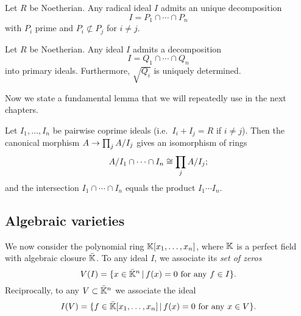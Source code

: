 \begin{proposition}
  Let $R$ be Noetherian. Any radical ideal $I$ admits an unique
  decomposition
  \begin{equation}
    \label{eq:213}
    I = P_1\cap\cdots\cap P_n
  \end{equation}
  with $P_i$ prime and $P_i\not\subset P_j$ for $i\ne j$.
\end{proposition}

\begin{theorem}
  Let $R$ be Noetherian. Any ideal $I$
  admits a decomposition
  \begin{equation}
    \label{eq:214}
    I = Q_1\cap\cdots\cap Q_n
  \end{equation}
  into primary ideals. Furthermore, $\sqrt{Q_i}$ is uniquely
  determined.
\end{theorem}

Now we state a fundamental lemma that we will repeatedly use in the
next chapters.

\begin{lemma}
  \label{th:chinese-remainder}
  Let $I_1,\ldots,I_n$ be pairwise coprime ideals (i.e.\ $I_i+I_j=R$ if
  $i\ne j$).  Then the canonical morphism $A\rightarrow\prod_j A/I_j$ gives an
  isomorphism of rings
  \begin{equation}
    \label{eq:211}
    A/I_1\cap\cdots\cap I_n \cong \prod_j A/I_j
    \text{;}
  \end{equation}
  and the intersection $I_1\cap\cdots\cap I_n$ equals the product
  $I_1\cdots I_n$.
\end{lemma}


\subsection{Algebraic varieties}
\label{sec:algebraic-varieties}
  We now consider the polynomial ring
$\mathbb{K}[x_1,\ldots,x_n]$, where $\mathbb{K}$ is a perfect field with algebraic
closure $\bar{\mathbb{K}}$. To any ideal $I$, we associate its \textit{set of
  zeros}
\begin{equation}
  \label{eq:215}
  V(I) = \{x\in\bar{\mathbb{K}}^n \,|\, f(x) = 0 \text{ for any } f\in I\}
  \text{.}
\end{equation}
Reciprocally, to any $V\subset\bar{\mathbb{K}}^n$ we associate the ideal
\begin{equation}
  \label{eq:216}
  I(V) = \{f\in\bar{\mathbb{K}}[x_1,\ldots,x_n] \,|\, f(x) = 0 \text{ for any } x\in V\}
  \text{.}
\end{equation}

